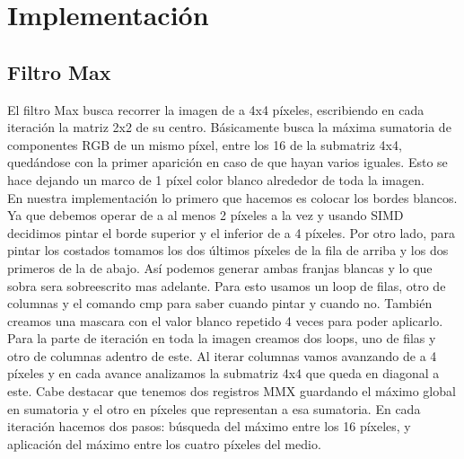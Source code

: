 \documentclass[a4paper]{article}
\begin{document}
\section{Implementación}

\subsection{Filtro Max}
El filtro Max busca recorrer la imagen de a 4x4 píxeles, escribiendo en cada iteración la matriz 2x2 de su centro. Básicamente busca la máxima sumatoria de componentes RGB de un mismo píxel, entre los 16 de la submatriz 4x4, quedándose con la primer aparición en caso de que hayan varios iguales. Esto se hace dejando un marco de 1 píxel color blanco alrededor de toda la imagen.\\
En nuestra implementación lo primero que hacemos es colocar los bordes blancos. Ya que debemos operar de a al menos 2 píxeles a la vez y usando SIMD decidimos pintar el borde superior y el inferior de a 4 píxeles. Por otro lado, para pintar los costados tomamos los dos últimos píxeles de la fila de arriba y los dos primeros de la de abajo. Así podemos generar ambas franjas blancas y lo que sobra sera sobreescrito mas adelante. Para esto usamos un loop de filas, otro de columnas y el comando cmp para saber cuando pintar y cuando no. También creamos una mascara con el valor blanco repetido 4 veces para poder aplicarlo.\\
Para la parte de iteración en toda la imagen creamos dos loops, uno de filas y otro de columnas adentro de este. Al iterar columnas vamos avanzando de a 4 píxeles y en cada avance analizamos la submatriz 4x4 que queda en diagonal a este. Cabe destacar que tenemos dos registros MMX guardando el máximo global en sumatoria y el otro en píxeles que representan a esa sumatoria. En cada iteración hacemos dos pasos: búsqueda del máximo entre los 16 píxeles, y aplicación del máximo entre los cuatro píxeles del medio.\\
\end{document}
